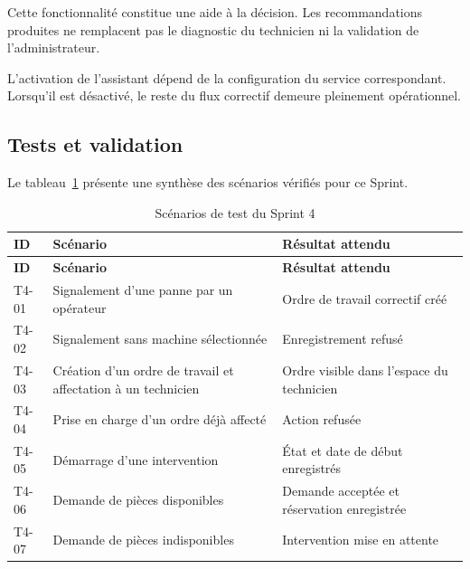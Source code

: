 Cette fonctionnalité constitue une aide à la décision. Les recommandations produites ne remplacent pas le diagnostic du technicien ni la validation de l'administrateur.

L'activation de l'assistant dépend de la configuration du service correspondant. Lorsqu'il est désactivé, le reste du flux correctif demeure pleinement opérationnel.

\subsection{Tests et validation}

Le tableau~\ref{tab:tests-sprint4} présente une synthèse des scénarios vérifiés pour ce Sprint.

{\footnotesize
\setlength{\tabcolsep}{4pt}
\begin{longtable}{|p{0.9cm}|>{\raggedright\arraybackslash}p{7cm}|>{\raggedright\arraybackslash}p{4.7cm}|}
\caption{Scénarios de test du Sprint 4}
\label{tab:tests-sprint4}\\
\hline
\textbf{ID} & \textbf{Scénario} & \textbf{Résultat attendu} \\
\hline
\endfirsthead

\hline
\textbf{ID} & \textbf{Scénario} & \textbf{Résultat attendu} \\
\hline
\endhead

T4-01 &
Signalement d'une panne par un opérateur &
Ordre de travail correctif créé \\
\hline

T4-02 &
Signalement sans machine sélectionnée &
Enregistrement refusé \\
\hline

T4-03 &
Création d'un ordre de travail et affectation à un technicien &
Ordre visible dans l'espace du technicien \\
\hline

T4-04 &
Prise en charge d'un ordre déjà affecté &
Action refusée \\
\hline

T4-05 &
Démarrage d'une intervention &
État et date de début enregistrés \\
\hline

T4-06 &
Demande de pièces disponibles &
Demande acceptée et réservation enregistrée \\
\hline

T4-07 &
Demande de pièces indisponibles &
Intervention mise en attente \\
\hline


\end{longtable}}
